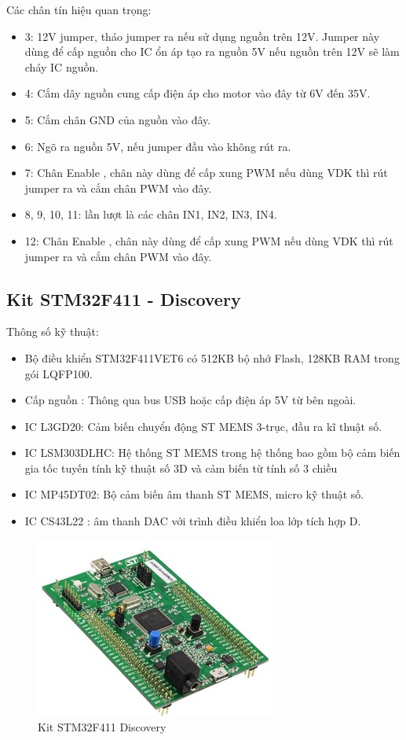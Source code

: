 Các chân tín hiệu quan trọng:
\begin{itemize}
\item 3: 12V jumper, tháo jumper ra nếu sử dụng nguồn trên 12V. Jumper này dùng để cấp nguồn cho IC ổn áp tạo ra nguồn 5V nếu nguồn trên 12V sẽ làm cháy IC nguồn.
\item 4: Cắm dây nguồn cung cấp điện áp cho motor vào đây từ 6V đến 35V.
\item 5: Cắm chân GND của nguồn vào đây.
\item 6: Ngõ ra nguồn 5V, nếu jumper đầu vào không rút ra.
\item 7: Chân Enable , chân này dùng để cấp xung PWM nếu dùng VDK thì rút jumper ra và cắm chân PWM vào đây.
\item 8, 9, 10, 11: lần lượt là các chân IN1, IN2, IN3, IN4.
\item 12: Chân Enable , chân này dùng để cấp xung PWM nếu dùng VDK thì rút jumper ra và cắm chân PWM vào đây.
\end{itemize}

\subsection{Kit STM32F411 - Discovery}
Thông số kỹ thuật:
\begin{itemize}
\item Bộ điều khiển STM32F411VET6 có 512KB bộ nhớ Flash, 128KB RAM trong gói LQFP100.
\item Cấp nguồn : Thông qua bus USB hoặc cấp điện áp 5V từ bên ngoài.
\item IC L3GD20: Cảm biến chuyển động ST MEMS 3-trục, đầu ra kĩ thuật số.
\item IC LSM303DLHC: Hệ thống ST MEMS trong hệ thống bao gồm bộ cảm biến gia tốc tuyến tính kỹ thuật số 3D và cảm biến từ tính số 3 chiều
\item IC MP45DT02: Bộ cảm biến âm thanh ST MEMS, micro kỹ thuật số.
\item IC CS43L22 : âm thanh DAC với trình điều khiển loa lớp tích hợp D.
\end{itemize}

\begin{figure}[ht]
\centering
\includegraphics[scale=1]{Chapters/Chapter4/Images/STM32F4.jpg}
\caption{Kit STM32F411 Discovery}
\label{fig:stm32f4}
\end{figure}


